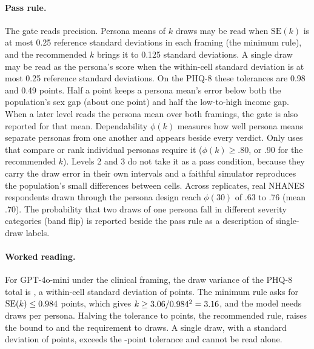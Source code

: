 \paragraph{Pass rule.}
The gate reads precision.
Persona means of $k$ draws may be read when $\mathrm{SE}(k)$ is at most 0.25 reference standard deviations in each framing (the minimum rule), and the recommended $k$ brings it to 0.125 standard deviations.
A single draw may be read as the persona's score when the within-cell standard deviation is at most 0.25 reference standard deviations.
On the PHQ-8 these tolerances are 0.98 and 0.49 points.
Half a point keeps a persona mean's error below both the population's sex gap (about one point) and half the low-to-high income gap. %
When a later level reads the persona mean over both framings, the gate is also reported for that mean.
Dependability $\phi(k)$ measures how well persona means separate personas from one another and appears beside every verdict.
Only uses that compare or rank individual personas require it ($\phi(k) \ge .80$, or .90 for the recommended $k$).
Levels 2 and 3 do not take it as a pass condition, because they carry the draw error in their own intervals and a faithful simulator reproduces the population's small differences between cells.
Across replicates, real NHANES respondents drawn through the persona design reach $\phi(30)$ of .63 to .76 (mean .70). %
The probability that two draws of one persona fall in different severity categories (band flip) is reported beside the pass rule as a description of single-draw labels.

\paragraph{Worked reading.}
For GPT-4o-mini under the clinical framing, the draw variance of the PHQ-8 total is \WkGateVar, a within-cell standard deviation of \WkGateSD{} points.
The minimum rule asks for $\mathrm{SE}(k) \le 0.984$ points, which gives $k \ge 3.06 / 0.984^2 = 3.16$, and the model needs \WkGateKMin{} draws per persona.
Halving the tolerance to \WkGateTolRec{} points, the recommended rule, raises the bound to \WkGateKRecExact{} and the requirement to \WkGateKRec{} draws.
A single draw, with a standard deviation of \WkGateSD{} points, exceeds the \WkGateTolMin-point tolerance and cannot be read alone. %


